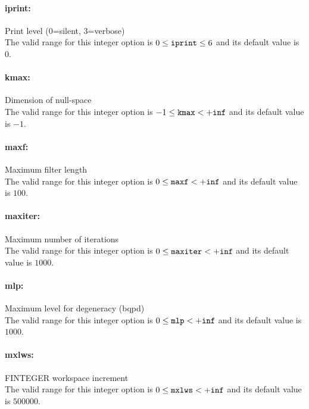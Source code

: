 \paragraph{iprint:}\label{sec:iprint} Print level (0=silent, 3=verbose) $\;$ \\
 The valid range for this integer option is
$0 \le {\tt iprint } \le 6$
and its default value is $0$.


\paragraph{kmax:}\label{sec:kmax} Dimension of null-space $\;$ \\
 The valid range for this integer option is
$-1 \le {\tt kmax } <  {\tt +inf}$
and its default value is $-1$.


\paragraph{maxf:}\label{sec:maxf} Maximum filter length $\;$ \\
 The valid range for this integer option is
$0 \le {\tt maxf } <  {\tt +inf}$
and its default value is $100$.


\paragraph{maxiter:}\label{sec:maxiter} Maximum number of iterations $\;$ \\
 The valid range for this integer option is
$0 \le {\tt maxiter } <  {\tt +inf}$
and its default value is $1000$.


\paragraph{mlp:}\label{sec:mlp} Maximum level for degeneracy (bqpd) $\;$ \\
 The valid range for this integer option is
$0 \le {\tt mlp } <  {\tt +inf}$
and its default value is $1000$.


\paragraph{mxlws:}\label{sec:mxlws} FINTEGER workspace increment $\;$ \\
 The valid range for this integer option is
$0 \le {\tt mxlws } <  {\tt +inf}$
and its default value is $500000$.


